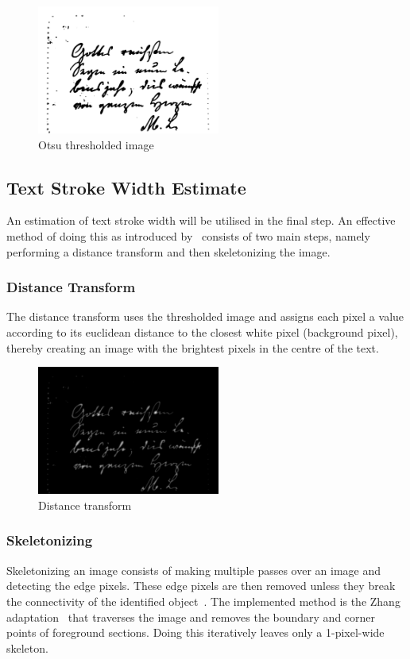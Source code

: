 \documentclass[a4paper, 12pt]{report}
\begin{document}
\begin{figure}[ht]
    \centering
    \includegraphics[width=6cm]{otsu thresholded.png}
    \caption{Otsu thresholded image}
    \label{fig:4}
\end{figure}

\subsection{Text Stroke Width Estimate}
An estimation of text stroke width will be utilised in the final step. An effective method of doing this as introduced by~\cite{strokewidth} consists of two main steps, namely performing a distance transform and then skeletonizing the image.

\subsubsection{Distance Transform}
The distance transform uses the thresholded image and assigns each pixel a value according to its euclidean distance to the closest white pixel (background pixel), thereby creating an image with the brightest pixels in the centre of the text.

\begin{figure}[ht]
    \centering
    \includegraphics[width=6cm]{distance transform.png}
    \caption{Distance transform}
    \label{fig:5}
\end{figure}

\subsubsection{Skeletonizing}
Skeletonizing an image consists of making multiple passes over an image and detecting the edge pixels. These edge pixels are then removed unless they break the connectivity of the identified object~\cite{scikit-image}. The implemented method is the Zhang adaptation~\cite{zhang_suen_1984} that traverses the image and removes the boundary and corner points of foreground sections. Doing this iteratively leaves only a 1-pixel-wide skeleton.
\end{document}
